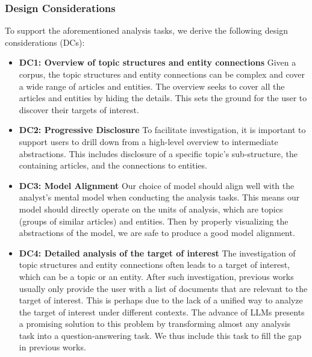 \subsubsection{Design Considerations}
To support the aforementioned analysis tasks, we derive the following design considerations (DCs):
\begin{itemize}
  \item \textbf{DC1: Overview of topic structures and entity connections}
  Given a corpus, the topic structures and entity connections can be complex and cover a wide range of articles and entities. 
  The overview seeks to cover all the articles and entities by hiding the details.
  This sets the ground for the user to discover their targets of interest.
  \item \textbf{DC2: Progressive Disclosure}
  To facilitate investigation, it is important to support users to drill down from a high-level overview to intermediate abstractions.
  This includes disclosure of a specific topic's sub-structure, the containing articles, and the connections to entities.
  \item \textbf{DC3: Model Alignment}
  Our choice of model should align well with the analyst's mental model when conducting the analysis tasks.
  This means our model should directly operate on the units of analysis, which are topics (groups of similar articles) and entities.
  Then by properly visualizing the abstractions of the model, we are safe to produce a good model alignment.
  \item \textbf{DC4: Detailed analysis of the target of interest}
  The investigation of topic structures and entity connections often leads to a target of interest, which can be a topic or an entity.
  After such investigation, previous works usually only provide the user with a list of documents that are relevant to the target of interest.
  This is perhaps due to the lack of a unified way to analyze the target of interest under different contexts.
  The advance of LLMs presents a promising solution to this problem by transforming almost any analysis task into a question-answering task.
  We thus include this task to fill the gap in previous works.
\end{itemize}





